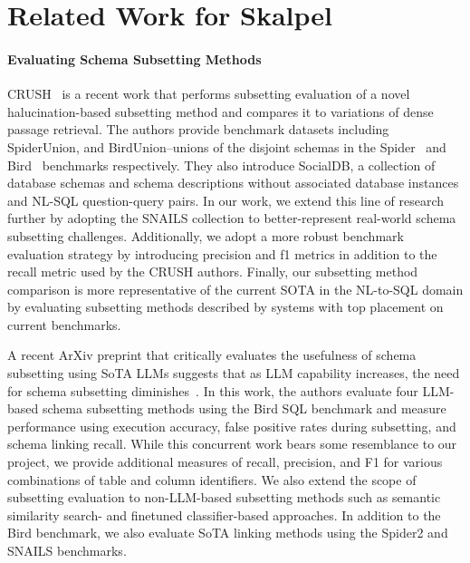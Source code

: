 \section{Related Work for Skalpel}


\paragraph{\textbf{Evaluating Schema Subsetting Methods}}
CRUSH~\cite{kothyari-etal-2023-crush4sql} is a recent work that performs subsetting evaluation of a novel halucination-based subsetting method and compares it to variations of dense passage retrieval.
The authors provide benchmark datasets including SpiderUnion, and BirdUnion--unions of the disjoint schemas in the Spider~\cite{benchmark-spider} and Bird~\cite{benchmark-bird} benchmarks respectively. They also introduce SocialDB, a collection of database schemas and schema descriptions without associated database instances and NL-SQL question-query pairs.
In our work, we extend this line of research further by adopting the  SNAILS collection to better-represent real-world schema subsetting challenges.
Additionally, we adopt a more robust benchmark evaluation strategy by introducing precision and f1 metrics in addition to the recall metric used by the CRUSH authors.
Finally, our subsetting method comparison is more representative of the current SOTA in the NL-to-SQL domain by evaluating subsetting methods described by systems with top placement on current benchmarks.

A recent ArXiv preprint that critically evaluates the usefulness of schema subsetting using SoTA LLMs suggests that as LLM capability increases, the need for schema subsetting diminishes~\cite{maamari2024deathschemalinkingtexttosql}.
In this work, the authors evaluate four LLM-based schema subsetting methods using the Bird SQL benchmark and measure performance using execution accuracy, false positive rates during subsetting, and schema linking recall.
While this concurrent work bears some resemblance to our \PROJECTNAME{ } project, we provide additional measures of recall, precision, and F1 for various combinations of table and column identifiers.
We also extend the scope of subsetting evaluation to non-LLM-based subsetting methods such as semantic similarity search- and finetuned classifier-based approaches.
In addition to the Bird benchmark, we also evaluate SoTA linking methods using the Spider2 and SNAILS benchmarks.

